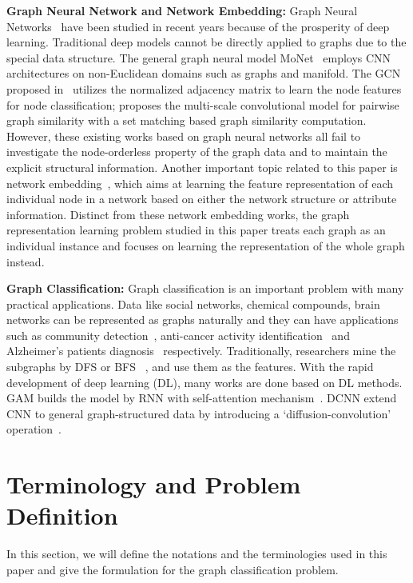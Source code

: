 \documentclass{article} \usepackage{iclr2020_conference,times}
\begin{document}
\textbf{Graph Neural Network and Network Embedding:} Graph Neural Networks~\citep{monti2017geometric, atwood2016diffusion, masci2015geodesic,kipf2016semi, battaglia2018relational} have been studied in recent years because of the prosperity of deep learning. Traditional deep models cannot be directly applied to graphs due to the special data structure. The general graph neural model MoNet~\citep{monti2017geometric} employs CNN architectures on non-Euclidean domains such as graphs and manifold. The GCN proposed in~\citep{kipf2016semi} utilizes the normalized adjacency matrix to learn the node features for node classification; \citep{bai2018convolutional} proposes the multi-scale convolutional model for pairwise graph similarity with a set matching based graph similarity computation. However, these existing works based on graph neural networks all fail to investigate the node-orderless property of the graph data  and to maintain the explicit structural information. Another important topic related to this paper is network embedding~\citep{NIPS2013_5071, lin2015learning, lai2017prune, abu2018watch, hamilton2017inductive}, which aims at learning the feature representation of each individual node in a network based on either the network structure or attribute information. Distinct from these network embedding works, the graph representation learning problem studied in this paper treats each graph as an individual instance and focuses on learning the representation of the whole graph instead.


\textbf{Graph Classification:} Graph classification is an important problem with many practical applications. Data like social networks, chemical compounds, brain networks can be represented as graphs naturally and they can have applications such as community detection~\citep{zhang2018end}, anti-cancer activity identification~\citep{kong2013discriminative, kong2010semi} and Alzheimer's patients diagnosis~\citep{tong2017multi, tong2015nonlinear} respectively. Traditionally, researchers mine the subgraphs by DFS or BFS ~\citep{saigo2009gboost, kong2013discriminative}, and use them as the features. With the rapid development of deep learning  (DL), many works are done based on DL methods. GAM builds the model by RNN with self-attention mechanism~\citep{lee2018graph}. DCNN extend CNN to general graph-structured data by introducing a ‘diffusion-convolution’ operation~\citep{atwood2016diffusion}.

 
\vspace*{-10pt}
\section{Terminology and Problem Definition} \label{sec:formulation}
\vspace*{-5pt}
In this section, we will define the notations and the terminologies used in this paper and give the formulation for the graph classification problem.
\vspace*{-10pt}
\end{document}
